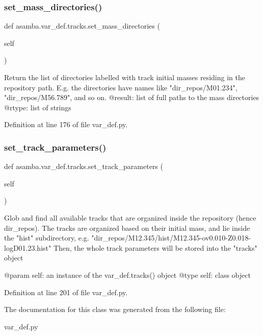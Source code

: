 \subsubsection{\texorpdfstring{set\+\_\+mass\+\_\+directories()}{set\_mass\_directories()}}
{\footnotesize\ttfamily def asamba.\+var\+\_\+def.\+tracks.\+set\+\_\+mass\+\_\+directories (\begin{DoxyParamCaption}\item[{}]{self }\end{DoxyParamCaption})}

\begin{DoxyVerb}Return the list of directories labelled with track initial masses residing in the repository path.
E.g. the directories have names like "dir_repos/M01.234", "dir_repos/M56.789", and so on.
@result: list of full paths to the mass directories
@rtype: list of strings
\end{DoxyVerb}
 

Definition at line 176 of file var\+\_\+def.\+py.

\mbox{\label{classasamba_1_1var__def_1_1tracks_a743c0e7e4af42a5c67f8a4be54a7d3c6}} 
\subsubsection{\texorpdfstring{set\+\_\+track\+\_\+parameters()}{set\_track\_parameters()}}
{\footnotesize\ttfamily def asamba.\+var\+\_\+def.\+tracks.\+set\+\_\+track\+\_\+parameters (\begin{DoxyParamCaption}\item[{}]{self }\end{DoxyParamCaption})}

\begin{DoxyVerb}Glob and find all available tracks that are organized inside the repository (hence dir_repos).
The tracks are organized based on their initial mass, and lie inside the "hist" subdirectory, e.g.
"dir_repos/M12.345/hist/M12.345-ov0.010-Z0.018-logD01.23.hist"
Then, the whole track parameters will be stored into the "tracks" object

@param self: an instance of the var_def.tracks() object
@type self: class object
\end{DoxyVerb}
 

Definition at line 201 of file var\+\_\+def.\+py.



The documentation for this class was generated from the following file\+:\begin{DoxyCompactItemize}
\item 
var\+\_\+def.\+py\end{DoxyCompactItemize}
